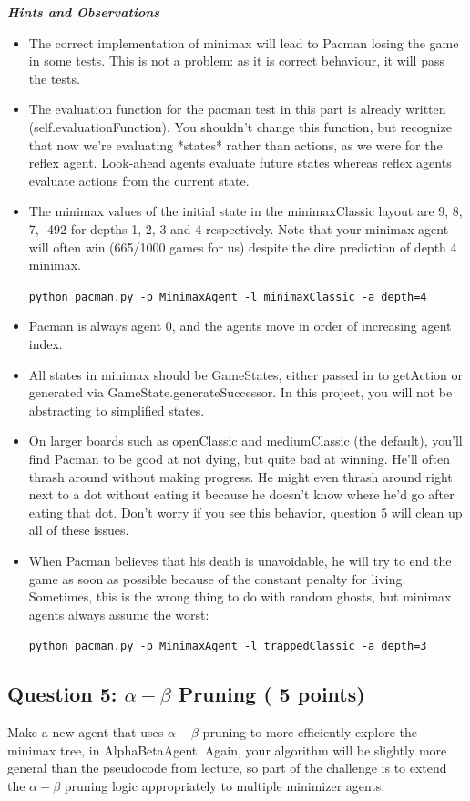 \documentclass[a4paper, 11pt]{article}
\begin{document}
\textbf{\textit{Hints and Observations}}
  \begin{itemize}\setlength{\itemsep}{-\itemsep}
\item The correct implementation of minimax will lead to Pacman losing the game in some tests. This is not a problem: as it is correct behaviour, it will pass the tests.
\item The evaluation function for the pacman test in this part is already written (self.evaluationFunction). You shouldn't change this function, but recognize that now we're evaluating *states* rather than actions, as we were for the reflex agent. Look-ahead agents evaluate future states whereas reflex agents evaluate actions from the current state.
\item The minimax values of the initial state in the minimaxClassic layout are 9, 8, 7, -492 for depths 1, 2, 3 and 4 respectively. Note that your minimax agent will often win (665/1000 games for us) despite the dire prediction of depth 4 minimax.

  \texttt{python pacman.py -p MinimaxAgent -l minimaxClassic -a depth=4}
\item Pacman is always agent 0, and the agents move in order of increasing agent index.
\item All states in minimax should be GameStates, either passed in to getAction or generated via GameState.generateSuccessor. In this project, you will not be abstracting to simplified states.
\item On larger boards such as openClassic and mediumClassic (the default), you'll find Pacman to be good at not dying, but quite bad at winning. He'll often thrash around without making progress. He might even thrash around right next to a dot without eating it because he doesn't know where he'd go after eating that dot. Don't worry if you see this behavior, question 5 will clean up all of these issues.
\item When Pacman believes that his death is unavoidable, he will try to end the game as soon as possible because of the constant penalty for living. Sometimes, this is the wrong thing to do with random ghosts, but minimax agents always assume the worst:

  \texttt{python pacman.py -p MinimaxAgent -l trappedClassic -a depth=3}

\end{itemize}
\subsection{Question 5: $\alpha-\beta$ Pruning ( 5 points)}
Make a new agent that uses $\alpha-\beta$ pruning to more efficiently explore the minimax tree, in \textsf{AlphaBetaAgent}. Again, your algorithm will be slightly more general than the pseudocode from lecture, so part of the challenge is to extend the $\alpha-\beta$ pruning logic appropriately to multiple minimizer agents.
\end{document}
